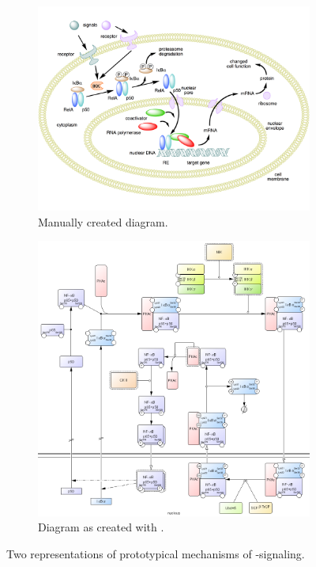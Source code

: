\documentclass[
	fontsize=10pt, %
	twoside=false, %
	secnumdepth=1, %
  toc=indentunnumbered %
]{kaobook}
\begin{document}


\begin{figure}[h]
  \centering
  \begin{subfigure}{0.4\textwidth}
    \centering
    \includegraphics[width=\textwidth]{NF-kB-mechanism/handdrawn.png}
    \caption{Manually created diagram.}
    \label{fig:process-diagram-old-vs-new:handdrawn}
  \end{subfigure}
  \hspace{1em}
  \begin{subfigure}{0.4\textwidth}
    \centering
    \includegraphics[width=\textwidth]{NF-kB-mechanism/CellDesigner.png}
    \caption{Diagram as created with \celldesigner.}
    \label{fig:process-diagram-old-vs-new:celldesigner}
  \end{subfigure}
  \caption{
    Two representations of prototypical mechanisms of \nfkb-signaling.
  }
  \label{fig:process-diagram-old-vs-new}
\end{figure}
\end{document}

